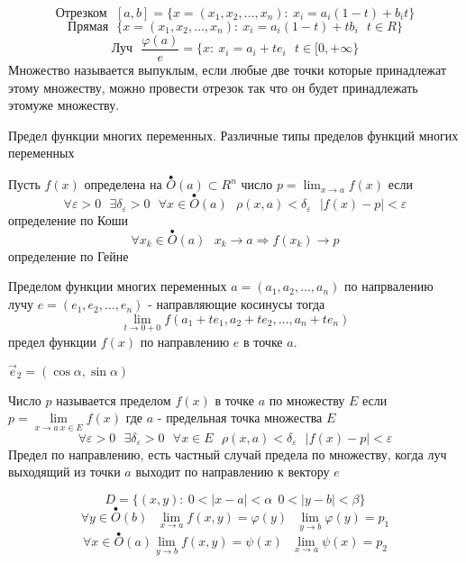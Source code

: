 \begin{define}
  $$
  \text{Отрезком} ~~~ [a,b] = \{ x = (x_1, x_2, \ldots, x_n): ~
  x_i = a_i(1 - t) + b_it \}
  $$
  $$
  \text{Прямая} ~~~ \{ x = (x_1, x_2, \ldots, x_n): ~ x_i = a_i(1 - t) +
  tb_i ~~~ t \in R \}
  $$
  $$
  \text{Луч} ~~~ \frac{\varphi(a)}{e} = \{ x: ~ x_i = a_i + te_i ~~~
  t \in [0, + \infty\}
  $$
  Множество называется выпуклым, если любые две точки которые принадлежат этому
  множеству, можно провести отрезок так что он будет принадлежать этомуже
  множеству.
\end{define}

\begin{title}[\Large]
  Предел функции многих переменных. Различные типы пределов функций многих
  переменных
\end{title}

\begin{define}
  Пусть $f(x)$ определена на $\stackrel{\bullet}{O}(a) \subset R^n$ число
  $p = \lim_{x \to a} f(x)$ если
  $$
  \forall \varepsilon > 0 ~~~ \exists \delta_{\varepsilon} > 0 ~~~
  \forall x \in \stackrel{\bullet}{O}(a) ~~~ \rho(x, a) < \delta_{\varepsilon}
  ~~~ |f(x) - p| < \varepsilon
  $$
  определение по Коши
  $$
  \forall x_k \in \stackrel{\bullet}{O}(a) ~~~ x_k \to a \Rightarrow
  f(x_k) \to p
  $$
  определение по Гейне
\end{define}

\begin{define}
  Пределом функции многих переменных $a = (a_1, a_2, \ldots, a_n)$ по
  напрвалению лучу $e = (e_1, e_2, \ldots, e_n)$ - направляющие косинусы тогда
  $$
  \lim_{t \to 0 +0} f(a_1 + te_1, a_2 + te_2, \ldots, a_n + te_n)
  $$
  предел функции $f(x)$ по направлению $e$ в точке $a$.

  $\vec e_2 = (\cos \alpha, \sin \alpha)$
\end{define}

\begin{define}
  Число $p$ называется пределом $f(x)$ в точке $a$ по множеству $E$ если
  $p = \lim \limits_{x \to a ~ x \in E} f(x)$ где $a$ - предельная точка
  множества $E$
  $$
  \forall \varepsilon > 0 ~~~ \exists \delta_{\varepsilon} > 0 ~~~
  \forall x \in E ~~~ \rho(x, a) < \delta_{\varepsilon} ~~~
  |f(x) - p| < \varepsilon
  $$
  Предел по направлению, есть частный случай предела по множеству, когда луч
  выходящий из точки $a$ выходит по направлению к вектору $e$

  $$
  D = \{ (x,y): ~ 0 < |x - a| < \alpha ~~ 0 < |y - b| < \beta \}
  $$
  $$
  \forall y \in \stackrel{\bullet}{O}(b) ~~~
  \lim_{x \to a} f(x, y) = \varphi(y) ~~~ \lim_{y \to b} \varphi(y) = p_1
  $$
  $$
  \forall x \in \stackrel{\bullet}{O}(a)
  \lim_{y \to b} f(x, y) = \psi(x) ~~~ \lim_{x \to a} \psi(x) = p_2
  $$
\end{define}

